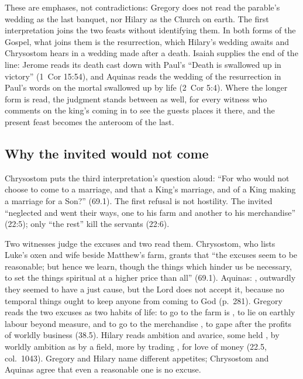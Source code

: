 These are emphases, not contradictions: Gregory does not read the parable's
wedding as the last banquet, nor Hilary as the Church on earth. The first
interpretation joins the two feasts without identifying them. In both forms
of the Gospel, what joins them is the resurrection, which Hilary's wedding awaits and Chrysostom hears in a wedding made after a
death. Isaiah supplies the end of the line: Jerome reads its death cast down
with Paul's ``Death is swallowed up in victory'' (1~Cor 15:54), and Aquinas
reads the wedding of the resurrection in Paul's words on the mortal swallowed
up by life (2~Cor 5:4). Where the longer form is read, the judgment stands
between as well, for every witness who comments on the king's coming in to see
the guests places it there, and the present feast becomes the anteroom of the
last.

\subsection{Why the invited would not come}

Chrysostom puts the third interpretation's question aloud: ``For who would not
choose to come to a marriage, and that a King's marriage, and of a King making
a marriage for a Son?'' (69.1). The first refusal is not hostility. The
invited ``neglected and went their ways, one to his farm and another to his
merchandise'' (22:5); only ``the rest'' kill the servants (22:6).

Two witnesses judge the excuses and two read them. Chrysostom, who lists
Luke's oxen and wife beside Matthew's farm, grants that ``the excuses seem to
be reasonable; but hence we learn, though the things which hinder us be
necessary, to set the things spiritual at a higher price than all'' (69.1).
Aquinas: , outwardly
they seemed to have a just cause, but the Lord does not accept it, because no
temporal things ought to keep anyone from coming to God (p.~281). Gregory
reads the two excuses as two habits of life: to go to the farm is
, to lie on earthly labour beyond
measure, and to go to the merchandise , to gape after the profits of worldly business (38.5). Hilary reads
ambition and avarice, some held , by
worldly ambition as by a field, more by trading , for love of money (22.5, col.~1043). Gregory and Hilary name
different appetites; Chrysostom and Aquinas agree that even a reasonable one
is no excuse.

